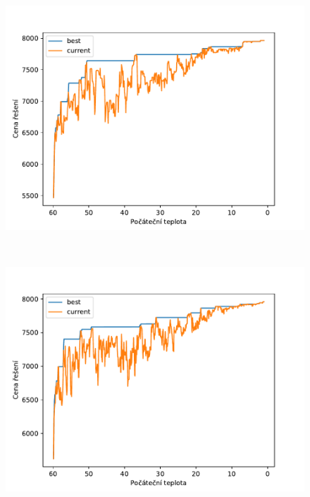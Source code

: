\documentclass[11pt]{article}
\begin{document}
\begin{figure}
\begin{minipage}[c]{0.325\textwidth}
    \end{minipage}
    \begin{minipage}[c]{0.325\textwidth}
        \centering \includegraphics[width=\textwidth]{img/C120.pdf} 
    \end{minipage}
    \\
    \begin{minipage}[c]{0.325\textwidth}
        \centering\includegraphics[width=\textwidth]{img/C180.pdf} 
    \end{minipage}
    \begin{minipage}[c]{0.325\textwidth}

\end{minipage}
\end{figure}
\end{document}
